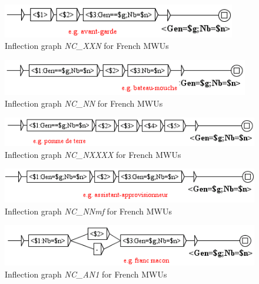 \begin{figure}[!htb]
  \centering
  \includegraphics[width=10.2cm]{resources/img/NC'XXN'FR.png}
  \caption{Inflection graph \emph{NC\_XXN} for French MWUs}
  \label{fig:NC'XXN'FR}
\end{figure}

\begin{figure}[!htb]
  \centering
  \includegraphics[width=10.8cm]{resources/img/NC'NN'FR.png}
  \caption{Inflection graph \emph{NC\_NN} for French MWUs}
  \label{fig:NC'NN'FR}
\end{figure}

\begin{figure}[!htb]
  \centering
  \includegraphics[width=12cm]{resources/img/NC'NXXXX'FR.png}
  \caption{Inflection graph \emph{NC\_NXXXX} for French MWUs}
  \label{fig:NC'NXXXX'FR}
\end{figure}

\begin{figure}[!htb]
  \centering
  \includegraphics[width=12cm]{resources/img/NC'NNmf'FR.png}
  \caption{Inflection graph \emph{NC\_NNmf} for French MWUs}
  \label{fig:NC'NNmf'FR}
\end{figure}

\begin{figure}[!htb]
  \centering
  \includegraphics[width=12cm]{resources/img/NC'AN1'FR.png}
  \caption{Inflection graph \emph{NC\_AN1} for French MWUs}
  \label{fig:NC'AN1'FR}
\end{figure}

